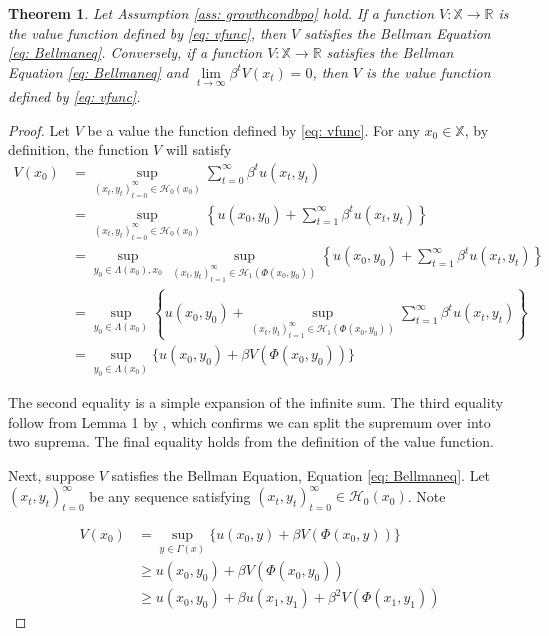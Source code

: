 \documentclass[12pt]{ectaart}
\newcommand{\1}{\mathbbm 1}
\theoremstyle{plain}
\newtheorem{theorem}{Theorem}[section]
\theoremstyle{definition}
\begin{document}
\begin{theorem}\label{eq: bpo1}
	Let Assumption \ref{ass: growthcondbpo} hold. If a function $V\colon \mathbb{X} \rightarrow \mathbb{R}$ is the value function defined by \eqref{eq: vfunc}, then $V$ satisfies the Bellman Equation \eqref{eq: Bellmaneq}. Conversely, if a function $V\colon \mathbb{X} \rightarrow \mathbb{R}$ satisfies the Bellman Equation \eqref{eq: Bellmaneq} and $\lim\limits_{t\rightarrow \infty}\beta^{t}V(x_{t})=0$, then $V$ is the value function defined by \eqref{eq: vfunc}.
\end{theorem}

\begin{proof}
	Let $V$ be a value the function defined by \eqref{eq: vfunc}. For any $x_{0}\in \mathbb{X}$, by definition, the function $V$ will satisfy
	\begin{align*}
	V(x_{0})&  = \sup_{(x_{t}, y_{t})_{t=0}^{\infty}\in \mathcal{H}_{0}(x_{0})} \sum_{t=0}^{\infty}\beta^{t}u(x_{t},y_{t})\\& = \sup_{(x_{t},y_{t})_{t=0}^{\infty}\in \mathcal{H}_{0}(x_{0})}\left\{ u(x_{0},y_{0}) + \sum_{t=1}^{\infty}\beta^{t}u(x_{t},y_{t})\right\}
	\\&  = \sup_{y_{0}\in \Lambda(x_{0}),x_{0}}\,\sup_{(x_{t}, y_{t})_{t=1}^{\infty}\in \mathcal{H}_{1}(\Phi(x_{0},y_{0}))}\left\{ u(x_{0},y_{0}) + \sum_{t=1}^{\infty}\beta^{t}u(x_{t},y_{t})\right\}\\
	& = \sup_{y_{0}\in \Lambda(x_{0})} \left\{ u(x_{0},y_{0})  + \sup_{(x_{t}, y_{t})_{t=1}^{\infty}\in \mathcal{H}_{1}(\Phi(x_{0},y_{0}))} \sum_{t=1}^{\infty}\beta^{t}u(x_{t},y_{t})\right\}\\ 
	&= \sup_{y_{0}\in \Lambda(x_{0})} \bigg\{u(x_{0},y_{0}) + \beta V(\Phi(x_{0},y_{0}))\bigg\}
	\end{align*}
	
	
	The second equality is a simple expansion of the infinite sum. The third equality follow from Lemma 1 by \cite{Kamihigashi2008}, which confirms we can split the supremum over into two suprema. The final equality holds from the definition of the value function. 
	
	Next, suppose $V$ satisfies the Bellman Equation, Equation \eqref{eq: Bellmaneq}. Let $(x_{t},y_{t})_{t=0}^{\infty}$ be any sequence satisfying $(x_{t},y_{t})_{t=0}^{\infty}\in \mathcal{H}_{0}(x_{0})$. Note 
	
	\begin{align*}
	V(x_{0})& = \sup_{y\in \Gamma(x)} \{u(x_{0},y) + \beta V(\Phi(x_{0},y))\}\\
	& \geq u(x_{0},y_{0}) + \beta V(\Phi(x_{0},y_{0})) \\
	& \geq u(x_{0},y_{0}) + \beta u(x_{1},y_{1}) +\beta^{2}V(\Phi(x_{1},y_{1}))
	\end{align*} 
	

\end{proof}
\end{document}
